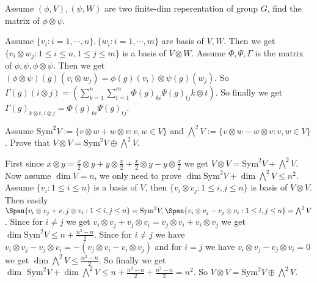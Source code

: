 \documentclass{ctexart}
\newif\ifpreface
\begin{document}
\large
\setlength{\baselineskip}{1.2em}
\ifpreface
	
	\newgeometry{left=2cm,right=2cm,top=2cm,bottom=2cm}
\else
	\maketitle
\fi
\begin{problem}
Assume \((\phi,V),(\psi,W)\) are two finite-dim reperentation of group \(G\), find the matrix of \(\phi \otimes \psi\).
\end{problem}

\begin{solution}
	Assume \(\{ v_i:i=1,\cdots,n\},\{ w_i:i=1,\cdots ,m\}\) are basis of \(V,W\). Then we get \(\{ v_i \otimes w_j:1 \leq i \leq n,1 \leq j \leq m\}\) is a basis of \(V \otimes W\).
	Assume \(\Phi,\Psi,\Gamma\) is the matrix of \(\phi,\psi,\phi \otimes \psi\).
	Then we get \(( \phi \otimes \psi)( g)( v_i \otimes w_j)=\phi( g)( v_i)\otimes \psi( g)( w_j)\).
	So \(\Gamma( g)( i \otimes j)=( \sum_{k=1}^{n}\sum_{t=1}^{m} \Phi( g)_{ki} \Psi( g)_{tj} k \otimes t)\).
	So finally we get \(\Gamma( g)_{k \otimes t,i \otimes j}=\Phi( g)_{ki}\Psi( g)_{tj}\).
\end{solution}

\begin{problem}
Assume \(\text{Sym}^2 V:=\{ v \otimes w + w \otimes v:v,w \in V\}\) and \(\bigwedge^2 V:=\{ v \otimes w - w \otimes v:v,w \in V\}\).
Prove that \(V \otimes V = \text{Sym}^2 V \oplus \bigwedge^2 V\).
\end{problem}

\begin{solution}
	First since \(x \otimes y = \frac{x}{2} \otimes y + y \otimes \frac{x}{2} + \frac{x}{2}\otimes y - y \otimes \frac{x}{2}\) we get \(V \otimes V = \text{Sym}^2 V + \bigwedge^2 V\).
	Now assume \(\dim V=n\), we only need to prove \(\dim\text{Sym}^2 V + \dim \bigwedge^2 V \leq n^2\).
	Assume \(\{ v_i:1 \leq i \leq n\}\) is a basis of \(V\), then \(\{v_i \otimes v_j:1 \leq i,j \leq n\}\) is basis of \(V \otimes V\).
	Then easily \(\Span\{ v_i \otimes v_j + v,j \otimes v_i:1 \leq i,j \leq n\}=\text{Sym}^2 V,\Span\{ v_i \otimes v_j - v_j \otimes v_i : 1 \leq i,j \leq n\}=\bigwedge^2 V\).
	Since for \(i \neq j\) we get \(v_i \otimes v_j+v_j \otimes v_i=v_j \otimes v_i + v_i \otimes v_j\) we get \(\dim \text{Sym}^2 V \leq n+\frac{n^2-n}{2}\).
	Since for \(i \neq j\) we have \(v_i \otimes v_j - v_j \otimes v_i = -( v_j \otimes v_i - v_i \otimes v_j)\) and for \(i = j \) we have \(v_i \otimes v_j - v_j \otimes v_i=0\) we get \(\dim \bigwedge^2 V \leq \frac{n^2-n}{2}\).
	So finally we get \(\dim \text{ Sym}^2 V +\dim \bigwedge^2 V \leq n+\frac{n^2-n}{2}+\frac{n^2-n}{2}=n^2\).
	So \(V \otimes V=\text{Sym}^2 V \oplus \bigwedge^2 V\).
\end{solution}
\end{document}
